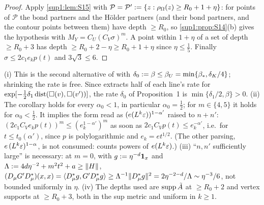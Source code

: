 \begin{proof}
Apply \cref{sup1:lem:S15} with $\mathcal P=\mathcal P':=\{z:\rho_\Omega(z)\ge R_0+1+\eta\}$: for points of $\mathcal P$ the bond partners and the H\"older partners (and their bond partners, and the contour points between them) have depth $\ge R_0$, so \cref{sup1:prop:S14}(b) gives the hypothesis with $M_Y=C_U(C_V\sigma)^m$. A point within $1+\eta$ of a set of depth $\ge R_0+3$ has depth $\ge R_0+2-\eta\ge R_0+1+\eta$ since $\eta\le\frac15$. Finally $\sigma\le2c_1e_kp(t)$ and $3\sqrt3\le6$.
\end{proof}

\begin{remark}\label{sup1:rem:S1}
(i) This is the second alternative of \cite[(2.5)]{Ba3} with $\delta_0:=\beta\le\beta_U=\min\{\beta_*,\delta_K/4\}$; shrinking the rate is free. Since \cite[p.~426]{Ba3} extracts half of each line's rate for $\exp[-\frac12\delta_1\operatorname{dist}(\square(v),\square(v'))]$, the rate $\delta_0$ of Proposition~1 is $\min\{\delta_1/2,\beta\}>0$. (ii) The corollary holds for every $\alpha_0<1$, in particular $\alpha_0=\frac12$; for $m\in\{4,5\}$ it holds for $\alpha_0<\frac12$. It implies the \cite[p.~414]{Ba3} form read as $(e(L^k\varepsilon))^{1-\alpha'}$ raised to $n+n'$: $(2c_1C_Ve_kp(t))^m\le(e_k^{1-\alpha'})^m$ as soon as $2c_1C_Vp(t)\le e_k^{-\alpha'}$, i.e.\ for $t\le t_0(\alpha')$, since $p$ is polylogarithmic and $e_k=et^{1/2}$. (The other parsing, $e\,(L^k\varepsilon)^{1-\alpha}$, is not consumed: \cite[(1.33)]{Ba3} counts powers of $e(L^k\varepsilon)$.) (iii) ``$n,n'$ sufficiently large'' is necessary: at $m=0$, with $g:=\eta^{-d}\mathbf 1_x$ and $\Lambda:=4d\eta^{-2}+m^2t^2+a\ge\lVert H\rVert$, $(D_\mu G'D_\mu^*)(x,x)=\langle D_\mu^*g,G'D_\mu^*g\rangle\ge\Lambda^{-1}\lVert D_\mu^*g\rVert^2=2\eta^{-2-d}/\Lambda\sim\eta^{-3}/6$, not bounded uniformly in $\eta$. (iv) The depths used are $\operatorname{supp}\tilde A$ at $\ge R_0+2$ and vertex supports at $\ge R_0+3$, both in the sup metric and uniform in $k\ge1$.
\end{remark}
